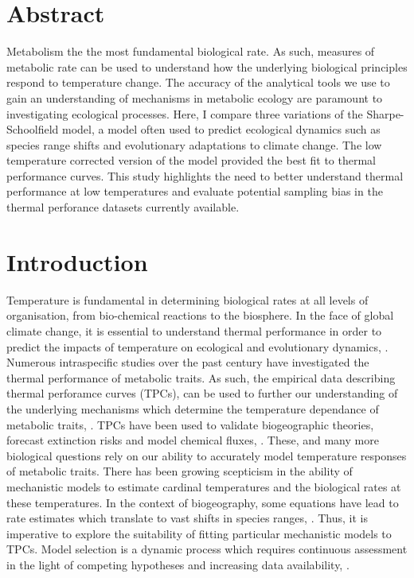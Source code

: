 \documentclass[11pt]{article}
\begin{document}

\section*{Abstract}
Metabolism the the most fundamental biological rate. As such, measures of metabolic rate can be used to understand how the underlying biological principles respond to temperature change. The accuracy of the analytical tools we use to gain an understanding of mechanisms in metabolic ecology are paramount to investigating ecological processes. Here, I compare three variations of the Sharpe-Schoolfield model, a model often used to predict ecological dynamics such as species range shifts and evolutionary adaptations to climate change. The low temperature corrected version of the model provided the best fit to thermal performance curves. This study highlights the need to better understand thermal performance at low temperatures and evaluate potential sampling bias in the thermal perforance datasets currently available.



\section*{Introduction}

Temperature is fundamental in determining biological rates at all levels of organisation, from bio-chemical reactions to the biosphere. In the face of global climate change, it is essential to understand thermal performance in order to predict the impacts of temperature on ecological and evolutionary dynamics, \cite{Brown2004}. Numerous intraspecific studies over the past century have investigated the thermal performance of metabolic traits. As such, the empirical data describing thermal perforamce curves (TPCs), can be used to further our understanding of the underlying mechanisms which determine the temperature dependance of metabolic traits, \cite{Dell2013}. TPCs have been used to validate biogeographic theories, forecast extinction risks and model chemical fluxes, \cite{Beaugrand2014, Massot2010, cox2000acceleration}. These, and many more biological questions rely on our ability to accurately model temperature responses of metabolic traits. There has been growing scepticism in the ability of mechanistic models to estimate cardinal temperatures and the biological rates at these temperatures. In the context of biogeography, some equations have lead to rate estimates which translate to vast shifts in species ranges, \cite{Low-Decarie2017a}. Thus, it is imperative to explore the suitability of fitting particular mechanistic models to TPCs. Model selection is a dynamic process which requires continuous assessment in the light of competing hypotheses and increasing data availability,  \cite{Levins1966, Johnson2004}.\\
\end{document}
